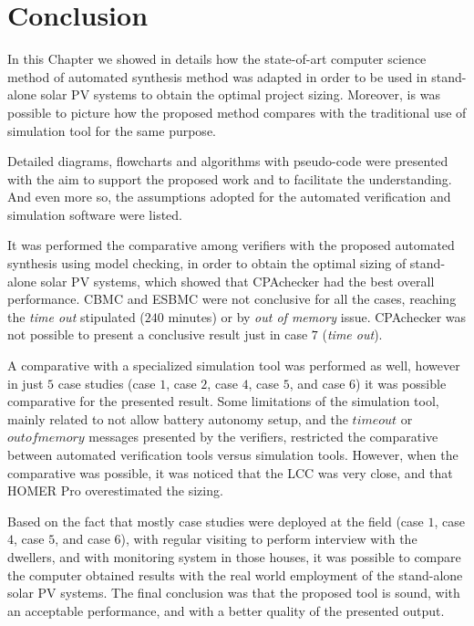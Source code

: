 \section{Conclusion}

In this Chapter we showed in details how the state-of-art computer science method of automated synthesis method was adapted in order to be used in stand-alone solar PV systems to obtain the optimal project sizing. Moreover, is was possible to picture how the proposed method compares with the traditional use of simulation tool for the same purpose.

Detailed diagrams, flowcharts and algorithms with pseudo-code were presented with the aim to support the proposed work and to facilitate the understanding. And even more so, the assumptions adopted for the automated verification and simulation software were listed. 

It was performed the comparative among verifiers with the proposed automated synthesis using model checking, in order to obtain the optimal sizing of stand-alone solar PV systems, which showed that CPAchecker had the best overall performance. CBMC and ESBMC were not conclusive for all the cases, reaching the \textit{time out} stipulated ($240$ minutes) or by \textit{out of memory} issue. CPAchecker was not possible to present a conclusive result just in case $7$ (\textit{time out}).

A comparative with a specialized simulation tool was performed as well, however in just $5$ case studies (case $1$, case $2$, case $4$, case $5$, and case $6$) it was possible comparative for the presented result. Some limitations of the simulation tool, mainly related to not allow battery autonomy setup, and the $time out$ or $out of memory$ messages presented by the verifiers, restricted the comparative between automated verification tools versus simulation tools. However, when the comparative was possible, it was noticed that the LCC was very close, and that HOMER Pro overestimated the sizing.

Based on the fact that mostly case studies were deployed at the field (case $1$, case $4$, case $5$, and case $6$), with regular visiting to perform interview with the dwellers, and with monitoring system in those houses, it was possible to compare the computer obtained results with the real world employment of the stand-alone solar PV systems. The final conclusion was that the proposed tool is sound, with an acceptable performance, and with a better quality of the presented output.